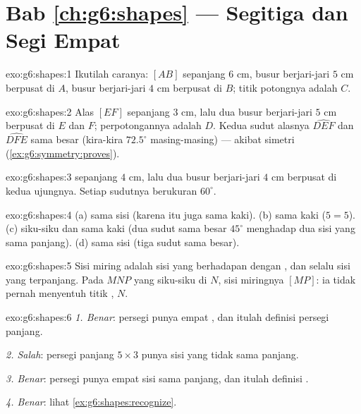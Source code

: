 \section*{Bab \ref{ch:g6:shapes} --- Segitiga dan Segi Empat}

\begin{solution}{exo:g6:shapes:1}
Ikutilah caranya:  $[AB]$ sepanjang $6$ cm, busur
berjari-jari $5$ cm berpusat di $A$, busur berjari-jari $4$ cm
berpusat di $B$; titik potongnya adalah $C$.
\end{solution}

\begin{solution}{exo:g6:shapes:2}
Alas $[EF]$ sepanjang $3$ cm, lalu dua busur berjari-jari $5$ cm
berpusat di $E$ dan $F$; perpotongannya adalah $D$. Kedua sudut
alasnya $\widehat{DEF}$ dan $\widehat{DFE}$ sama besar (kira-kira
$72.5^\circ$ masing-masing) --- akibat simetri 
(\cref{ex:g6:symmetry:proves}).
\end{solution}

\begin{solution}{exo:g6:shapes:3}
 sepanjang $4$ cm, lalu dua busur berjari-jari $4$ cm
berpusat di kedua ujungnya. Setiap sudutnya berukuran $60^\circ$.
\end{solution}

\begin{solution}{exo:g6:shapes:4}
(a) sama sisi (karena itu juga sama kaki). \quad
(b) sama kaki ($5 = 5$). \quad
(c) siku-siku dan sama kaki (dua sudut sama besar $45^\circ$
menghadap dua sisi yang sama panjang). \quad
(d) sama sisi (tiga sudut sama besar).
\end{solution}

\begin{solution}{exo:g6:shapes:5}
Sisi miring adalah sisi yang berhadapan dengan , dan
selalu sisi yang terpanjang. Pada $MNP$ yang siku-siku di $N$, sisi
miringnya $[MP]$: ia tidak pernah menyentuh titik , $N$.
\end{solution}

\begin{solution}{exo:g6:shapes:6}
\emph{1. Benar}: persegi punya empat , dan itulah
definisi persegi panjang.

\emph{2. Salah}: persegi panjang $5 \times 3$ punya sisi yang tidak sama panjang.

\emph{3. Benar}: persegi punya empat sisi sama panjang, dan itulah
definisi .

\emph{4. Benar}: lihat \cref{ex:g6:shapes:recognize}.
\end{solution}

